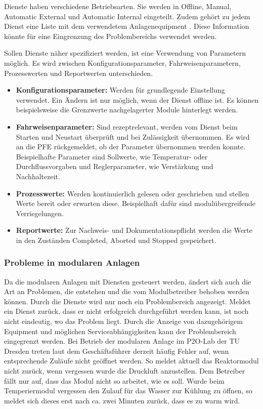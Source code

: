 Dienste haben verschiedene Betriebsarten. Sie werden in Offline, Manual, Automatic External und Automatic Internal eingeteilt. Zudem gehört zu jedem Dienst eine Liste mit dem verwendetem Anlagenequipment \cite{VDI2658-Blatt4}. Diese Information könnte für eine Eingrenzung des Problembereichs verwendet werden.

Sollen Dienste näher spezifiziert werden, ist eine Verwendung von Parametern möglich. Es wird zwischen Konfigurationsparameter, Fahrweisenparametern, Prozesswerten und Reportwerten unterschieden. \cite{VDI2658-Blatt4}
\begin{itemize}
\item \textbf{Konfigurationsparameter:} Werden für grundlegende Einstellung verwendet. Ein Ändern ist nur möglich, wenn der Dienst offline ist. Es können beispielsweise die Grenzwerte nachgelagerter Module hinterlegt werden. 
\item \textbf{Fahrweisenparameter:} Sind rezeptrelevant, werden vom Dienst beim Starten und Neustart überprüft und bei Zulässigkeit übernommen. Es wird an die PFE rückgemeldet, ob der Parameter übernommen werden konnte. Beispielhafte Parameter sind Sollwerte, wie Temperatur- oder Durchflussvorgaben und Reglerparameter, wie Verstärkung und Nachhaltezeit.
\item \textbf{Prozesswerte:} Werden kontinuierlich gelesen oder geschrieben und stellen Werte bereit oder erwarten diese. Beispielhaft dafür sind modulübergreifende Verriegelungen.
\item \textbf{Reportwerte:} Zur Nachweis- und Dokumentationspflicht werden die Werte in den Zuständen Completed, Aborted und Stopped gespeichert.
\end{itemize}

\subsubsection*{Probleme in modularen Anlagen}
\label{Probleme-modulare-Anlage}
Da die modularen Anlagen mit Diensten gesteuert werden, ändert sich auch die Art an Problemen, die entstehen und die vom Modulbetreiber behoben werden können. Durch die Dienste wird nur noch ein Problembereich angezeigt. Meldet ein Dienst zurück, dass er nicht erfolgreich durchgeführt werden kann, ist noch nicht eindeutig, wo das Problem liegt. Durch die Anzeige von dazugehörigem Equipment und möglichen Serviceabhängigkeiten kann der Problembereich eingegrenzt werden. Bei Betrieb der modularen Anlage im P2O-Lab der TU Dresden treten laut dem Geschäftsführer derzeit häufig Fehler auf, wenn entsprechende Zuläufe nicht geöffnet werden. So meldet aktuell das Reaktormodul nicht zurück, wenn vergessen wurde die Druckluft anzustellen. Dem Betreiber fällt nur auf, dass das Modul nicht so arbeitet, wie es soll. Wurde beim Temperiermodul vergessen den Zulauf für das Wasser zur Kühlung zu öffnen, so meldet sich dieses erst nach ca. zwei Minuten zurück, dass es zu warm wird.

